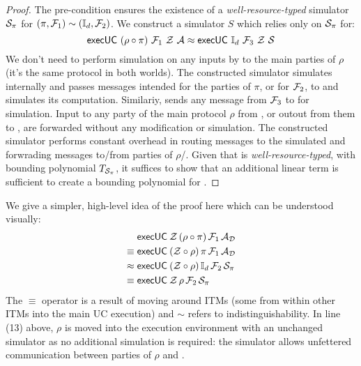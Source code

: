 \begin{proof}
The pre-condition ensures the existence of a \textit{well-resource-typed} simulator $\mathcal{S}_\pi$ for $(\pi, \mathcal{F}_1) \sim (\mathbb{I}_d, \mathcal{F}_2)$. 
We construct a simulator $S$ which relies only on $\mathcal{S}_\pi$ for:
\[
	{\mathsf {execUC}}\ (\rho \circ \pi)\ \mathcal{F}_1\ \mathcal{Z}\ \mathcal{A} \approx {\mathsf {execUC}}\ \mathbb{I}_d\ \mathcal{F}_3\ \mathcal{Z}\ \mathcal{S}
\]	
We don't need to perform simulation on any inputs by \Z to the main parties of $\rho$ (it's the same protocol in both worlds).
The constructed simulator \Sim simulates \SIM{\pi} internally and passes messages intended for the parties of $\pi$, or for $\mathcal{F}_2$, to \SIM{\pi} and simulates its computation.
Similariy, \Sim sends any message from $\mathcal{F}_3$ to \SIM{\pi} for simulation.  
Input to any party of the main protocol $\rho$ from \Z, or outout from them to \Sim, are forwarded without any modification or simulation.
The constructed simulator performs constant overhead in routing messages to the simulated \SIM{\pi} and forwrading messages to/from parties of $\rho$/\Z. 
Given that \SIM{\pi} is \textit{well-resource-typed}, with bounding polynomial $T_{\mathcal{S}_{\pi}}$, it suffices to show that an additional linear term is sufficient to create a bounding polynomial for \Sim.

\end{proof}

We give a simpler, high-level idea of the proof here which can be understood visually:
\begin{align}
& {\mathsf {execUC}} \: \mathcal{Z} \, (\rho \circ \pi) \, \mathcal{F}_1 \, \mathcal{A}_\mathcal{D} \\
\equiv \; & {\mathsf {execUC}} \: (\mathcal{Z} \circ \rho) \, \pi \, \mathcal{F}_1 \, \mathcal{A}_\mathcal{D} \\
\approx \; & {\mathsf {execUC}} \: (\mathcal{Z} \circ \rho) \, \mathbb{I}_d \, \mathcal{F}_2 \, \mathcal{S}_{\pi} \\
\equiv \; & {\mathsf {execUC}} \: \mathcal{Z} \, \rho \, \mathcal{F}_2 \, \mathcal{S}_{\pi} 
\end{align}
The $\equiv$ operator is a result of moving around ITMs (some from within other ITMs into the main UC execution) and $\sim$ refers to indistinguishability.
In line (13) above, $\rho$ is moved into the execution environment with an unchanged simulator as no additional simulation is required: the simulator allows unfettered communication between parties of $\rho$ and \Z.

